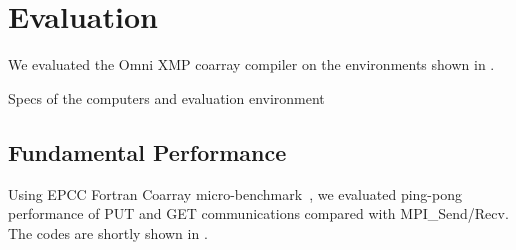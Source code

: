 \section{Evaluation}\label{sec:eval}

We evaluated the Omni XMP coarray compiler on the environments shown in .

\begin{table}[bth]
 \caption{Specs of the computers and evaluation environment}\label{tab:specs}
 \begin{center}\small
  
 \end{center}
\end{table}


\subsection{Fundamental Performance}


Using EPCC Fortran Coarray micro-benchmark~\cite{EPCC}, we evaluated ping-pong performance 
of PUT and GET communications compared with MPI\_Send/Recv.
The codes are shortly shown in .

